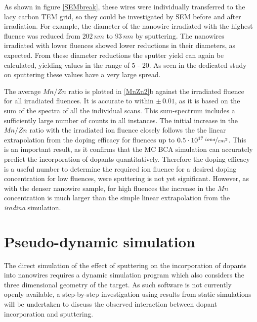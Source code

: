 As shown in figure \ref{SEMbreak}, these wires were individually transferred to the lacy carbon TEM grid, so they could be investigated by SEM before and after irradiation. For example, the diameter of the nanowire irradiated with the highest fluence was reduced from $202\,nm$ to $93\,nm$ by sputtering. The nanowires irradiated with lower fluences showed lower reductions in their diameters, as expected. From these diameter reductions the sputter yield can again be calculated, yielding values in the range of 5 - 20. As seen in the dedicated study on sputtering these values have a very large spread. 

The average $Mn/Zn$ ratio is plotted in \ref{MnZn2}b against the irradiated fluence for all irradiated fluences. It is accurate to within $\pm\,0.01$, as it is based on the sum of the spectra of all the individual scans. This sum-spectrum includes a sufficiently large number of counts in all instances. The initial increase in the $Mn/Zn$ ratio with the irradiated ion fluence closely follows the the linear extrapolation from the doping efficacy for fluences up to $0.5\cdot 10^{17}\,\nicefrac{ions}{cm^2}$. This is an important result, as it confirms that the MC BCA simulation can accurately predict the incorporation of dopants quantitatively. Therefore the doping efficacy is a useful number to determine the required ion fluence for a desired doping concentration for low fluences, were sputtering is not yet significant. However, as with the denser nanowire sample, for high fluences the increase in the $Mn$ concentration is much larger than the simple linear extrapolation from the \emph{iradina} simulation. 


\section{Pseudo-dynamic simulation}

The direct simulation of the effect of sputtering on the incorporation of dopants into nanowires requires a dynamic simulation program which also considers the three dimensional geometry of the target. As such software is not currently openly available, a step-by-step investigation using results from static simulations will be undertaken to discuss the observed interaction between dopant incorporation and sputtering.


